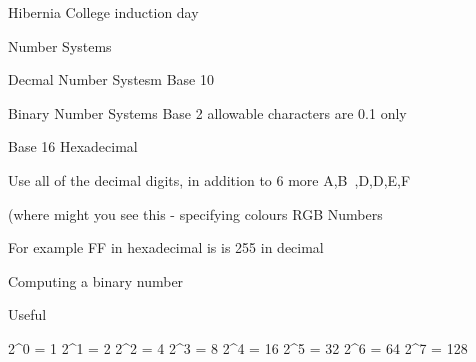 Hibernia College induction day

Number Systems

Decmal Number Systesm
Base 10

Binary Number Systems
Base 2
allowable characters are {0.1} only

Base 16 Hexadecimal

Use all of the decimal digits, in addition to 6 more A,B~,D,D,E,F

(where might you see this  - specifying colours RGB Numbers

For example FF in hexadecimal is is 255 in decimal 



Computing a binary number

Useful

2^0 = 1
2^1 = 2
2^2 = 4
2^3 = 8
2^4 = 16
2^5 = 32
2^6 = 64
2^7 = 128

